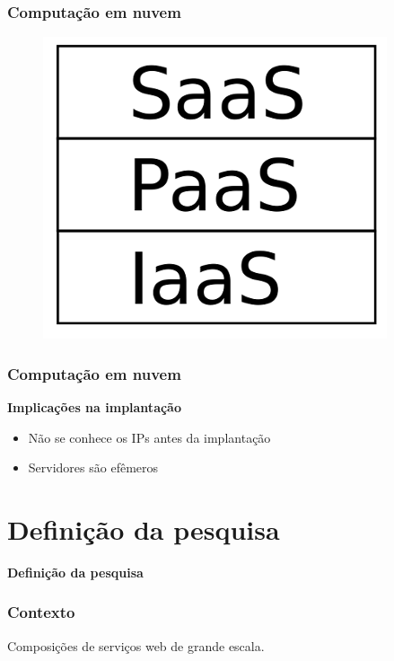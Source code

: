 \documentclass{beamer}
\newcommand\sectiontitle[1]{\begin{center}\huge\textbf{#1}\end{center}}
\newcommand\subtitulo[1]{{\large \textbf{#1}}}
\newcommand\frase[1]{\begin{center}\large#1\end{center}}
\begin{document}

\begin{frame}
\frametitle{Computação em nuvem}

\begin{figure}
\includegraphics[width=0.5\linewidth]{img/cloud}
\end{figure}

\end{frame}


\begin{frame}
\frametitle{Computação em nuvem}

\subtitulo{Implicações na implantação}

\begin{itemize}
\item Não se conhece os IPs antes da implantação
\item Servidores são efêmeros
\end{itemize}


\end{frame}


\section{Definição da pesquisa}

\begin{frame}

\sectiontitle{Definição da pesquisa}

\end{frame}


\begin{frame}
\frametitle{Contexto}

\frase{Composições de serviços web de grande escala.}

\end{frame}
\end{document}
